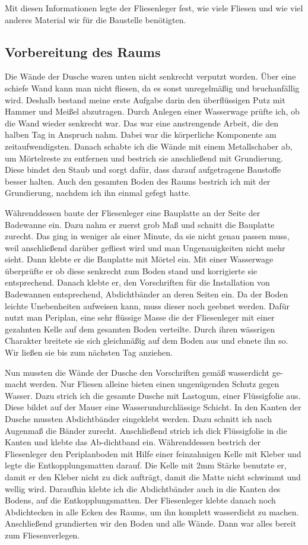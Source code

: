 Mit diesen Informationen legte der Fliesenleger fest, wie viele Fliesen und wie viel anderes Material wir für die Baustelle benötigten. 

\subsection{Vorbereitung des Raums}
 
Die Wände der Dusche waren unten nicht senkrecht verputzt worden. Über eine schiefe Wand kann man nicht fliesen, da es sonst unregelmäßig und bruchanfällig wird. Deshalb bestand meine erste Aufgabe darin den überflüssigen Putz mit Hammer und Meißel abzutragen. Durch Anlegen einer Wasserwage prüfte ich, ob die Wand wieder senkrecht war. Das war eine anstrengende Arbeit, die den halben Tag in Anspruch nahm. Dabei war die körperliche Komponente am zeitaufwendigsten. Danach schabte ich die Wände mit einem Metallschaber ab, um Mörtelreste zu entfernen und bestrich sie anschließend mit Grundierung. Diese bindet den Staub und sorgt dafür, dass darauf aufgetragene Baustoffe besser halten. Auch den gesamten Boden des Raums bestrich ich mit der Grundierung, nachdem ich ihn einmal gefegt hatte.

Währenddessen baute der Fliesenleger eine Bauplatte an der Seite der Badewanne ein. Dazu nahm er zuerst grob Maß und schnitt die Bauplatte zurecht. Das ging in weniger als einer Minute, da sie nicht genau passen muss, weil anschließend darüber gefliest wird und man Ungenauigkeiten nicht mehr sieht. Dann klebte er die Bauplatte mit Mörtel ein. Mit einer Wasserwage überprüfte er ob diese senkrecht zum Boden stand und korrigierte sie entsprechend. Danach klebte er, den Vorschriften für die Installation von Badewannen entsprechend, Abdichtbänder an deren Seiten ein. Da der Boden leichte Unebenheiten aufweisen kann, muss dieser noch geebnet werden. Dafür nutzt man Periplan, eine sehr flüssige Masse die der Fliesenleger mit einer gezahnten Kelle auf dem gesamten Boden verteilte. Durch ihren wässrigen Charakter breitete sie sich gleichmäßig auf dem Boden aus und ebnete ihn so. Wir ließen sie bis zum nächsten Tag anziehen. 

Nun mussten die Wände der Dusche den Vorschriften gemäß wasserdicht ge-macht werden. Nur Fliesen alleine bieten einen ungenügenden Schutz gegen Wasser. Dazu strich ich die gesamte Dusche mit Lastogum, einer Flüssigfolie aus. Diese bildet auf der Mauer eine Wasserundurchlässige Schicht. In den Kanten der Dusche mussten Abdichtbänder eingeklebt werden. Dazu schnitt ich nach Augenmaß die Bänder zurecht. Anschließend strich ich dick Flüssigfolie in die Kanten und klebte das Ab-dichtband ein. Währenddessen bestrich der Fliesenleger den Periplanboden mit Hilfe einer feinzahnigen Kelle mit Kleber und legte die Entkopplungsmatten darauf. Die Kelle mit 2mm Stärke benutzte er, damit er den Kleber nicht zu dick aufträgt, damit die Matte nicht schwimmt und wellig wird. Daraufhin klebte ich die Abdichtbänder auch in die Kanten des Bodens, auf die Entkopplungsmatten. Der Fliesenleger klebte danach noch Abdichtecken in alle Ecken des Raums, um ihn komplett wasserdicht zu machen. Anschließend grundierten wir den Boden und alle Wände. Dann war alles bereit zum Fliesenverlegen.

